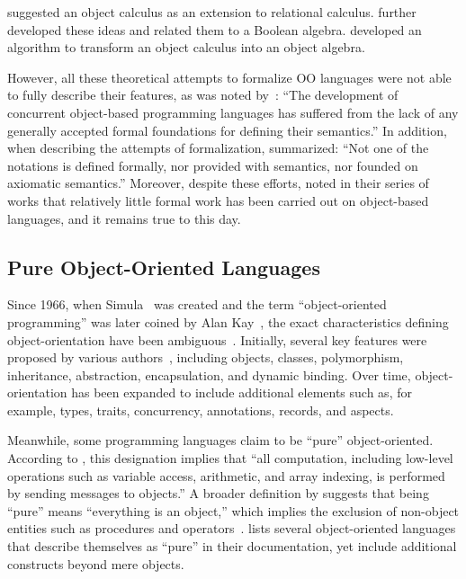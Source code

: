\citet{bancilhon1985calculus} suggested an object calculus as an extension to relational calculus.
\citet{jankowska2003anotheroop} further developed these ideas and related them to a Boolean algebra.
\citet{leekwakryu1996transform} developed an algorithm to transform an object calculus into an object algebra.

However, all these theoretical attempts to formalize OO languages were not able to fully describe their features, as was noted by~\citet{nierstrasz1991towards}: ``The development of concurrent object-based programming languages has suffered from the lack of any generally accepted formal foundations for defining their semantics.''
In addition, when describing the attempts of formalization, \citet{eden2002visual} summarized: ``Not one of the notations is defined formally, nor provided with  semantics, nor founded on axiomatic semantics.''
Moreover, despite these efforts, \citet{ciaffaglione2003reasoning,ciaffaglione2003typetheories,ciaffaglione2007theory_of_contexts} noted in their series of works that relatively little formal work has been carried out on object-based languages, and it remains true to this day.

\subsection{Pure Object-Oriented Languages}

Since 1966, when Simula~\citep{dahl1966simula} was created and the term ``object-oriented programming'' was later coined by
Alan Kay~\citep{kay97keynote}, the exact characteristics defining object-orientation have been ambiguous~\citep{stefik1985object,madsen1988object,armstrong2006quarks}.
Initially, several key features were proposed by various authors~\citep{nygaard1986basic,stroustrup1987object,meyer1988object,korson1990understanding,wirfs1990designing,coad1991object,booch1994object}, including objects, classes, polymorphism, inheritance, abstraction, encapsulation, and dynamic binding.
Over time, object-orientation has been expanded to include additional elements such as, for example, types, traits, concurrency, annotations, records, and aspects.

Meanwhile, some programming languages claim to be ``pure'' object-oriented.
According to \citet{chambers1991making}, this designation implies that ``all computation, including low-level operations such as variable access, arithmetic, and array indexing, is performed by sending messages to objects.''
A broader definition by \citet{west2004object} suggests that being ``pure'' means ``everything is an object,'' which implies the exclusion of non-object entities such as procedures and operators~\citep{joque2016invention}.
 lists several object-oriented languages that describe themselves as ``pure'' in their documentation, yet include additional constructs beyond mere objects.

